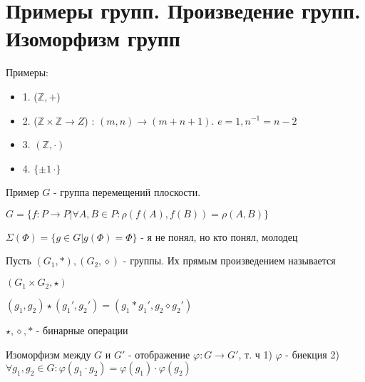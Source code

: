 \section{Примеры групп. Произведение групп. Изоморфизм групп}
Примеры:
\begin{itemize}
\item[] 1. ($\mathbb{Z}, +$)
\item[] 2. ($\mathbb{Z}\times \mathbb{Z} \to Z$) : $(m, n) \to (m+n+1)$. $e=1, n^{-1}=n-2$
\item[] 3. $(\mathbb{Z}, \cdot)$
\item[] 4. $\{\pm 1\, \cdot \}$
\end{itemize}

Пример $G$ - группа перемещений плоскости.

$G = \{f: P \to P | \forall A, B \in P : \rho (f(A), f(B)) = \rho(A, B)\}$

$\Sigma(\Phi) = \{g \in G | g(\Phi) = \Phi\}$ - я не понял, но кто понял, молодец

\begin{conj}
    Пусть $(G_1, *), (G_2, \diamond)$ - группы. Их прямым произведением называется
    
    $(G_1\times G_2, \star)$
    
    $(g_1, g_2)\star (g_1', g_2') = (g_1*g_1', g_2\diamond g_2')$
    
$\star, \diamond, *$ - бинарные операции
\end{conj}
\begin{conj}
    Изоморфизм между $G$ и $G'$ - отображение $\varphi : G \to G'$, т. ч
        1) $\varphi$ - биекция
        2) $\forall g_1, g_2 \in G : \varphi (g_1\cdot  g_2) = \varphi (g_1)\cdot \varphi(g_2)$
\end{conj}